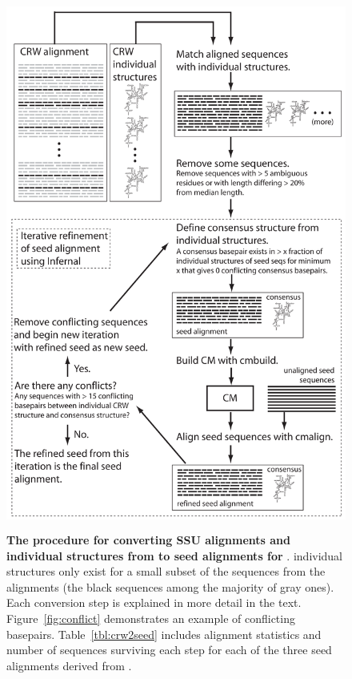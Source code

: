 \begin{figure}
  \begin{center}
\includegraphics[height=6.9in]{Figures/crw2seed-schematic}
        \caption[The procedure for converting SSU alignments and
          individual structures from  to seed alignments for
          .]  {\textbf{The procedure for converting
            SSU alignments and individual structures from  to seed
            alignments for }.  individual structures
          only exist for a small subset of the sequences from the 
          alignments (the black sequences among the majority of gray
          ones). Each conversion step is explained
          in more detail in the text. 
          Figure~\ref{fig:conflict}
          demonstrates an example of conflicting basepairs. 
          Table~\ref{tbl:crw2seed} includes alignment
          statistics and number of sequences surviving each step for
          each of the three seed alignments derived from .}
  \end{center}
\label{fig:crw2seed}
\end{figure}

